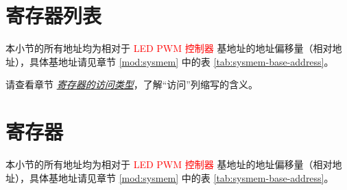 \documentclass[main\_\_CN.tex]{subfiles}
\begin{document}



\clearpage
\hypertarget{ledpwm-reg-summ}{}
\section{寄存器列表}
\label{sec:ledpwm-reg-summ}

本小节的所有地址均为相对于 \textcolor{red}{LED PWM 控制器} 基地址的地址偏移量（相对地址），具体基地址请见章节 \ref{mod:sysmem} \textit{} 中的表 \ref{tab:sysmem-base-address}。

请查看章节 \hyperref[glossary-access-types]{\textit{寄存器的访问类型}}，了解“访问”列缩写的含义。






\clearpage
\section{寄存器}

本小节的所有地址均为相对于 \textcolor{red}{LED PWM 控制器} 基地址的地址偏移量（相对地址），具体基地址请见章节 \ref{mod:sysmem} \textit{} 中的表 \ref{tab:sysmem-base-address}。


\end{document}
